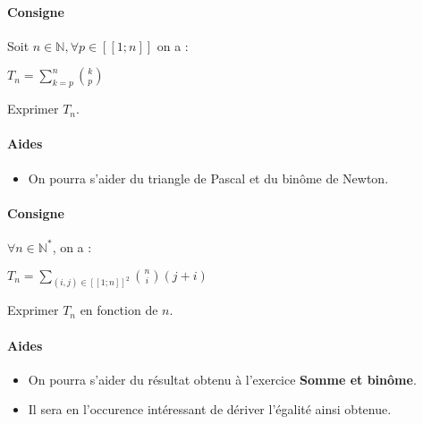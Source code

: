 \documentclass[a4paper]{report}
\begin{document}
				\begin{tcolorbox}[colback=white,colframe=black,title=Exercice - Somme et binôme]
				\paragraph{Consigne}
					Soit $n \in \mathbb{N}, \forall p \in [\![1;n]\!]$ on a :
					\begin{center}
						$T_n = \sum_{k=p}^{n} \binom{k}{p}$
					\end{center}
					Exprimer $T_n$.
					
				\tcblower					
					
				\paragraph{Aides}
					\begin{itemize}
						\item On pourra s'aider du triangle de Pascal et du binôme de Newton.
					\end{itemize}
				\end{tcolorbox}
				
				\begin{tcolorbox}[colback=white,colframe=black,title=Exercice - Somme\underline{s} et binôme]
				\paragraph{Consigne}
					$\forall n \in \mathbb{N^*}$, on a :
					\begin{center}
						$T_n = \sum_{(i,j) \in [\![1;n]\!]^2} \binom{n}{i} (j+i)$
					\end{center}
					Exprimer $T_n$ en fonction de $n$.
					
				\tcblower					
					
				\paragraph{Aides}
					\begin{itemize}
						\item On pourra s'aider du résultat obtenu à l'exercice \textbf{Somme et binôme}.
						\item Il sera en l'occurence intéressant de dériver l'égalité ainsi obtenue.
					\end{itemize}
				\end{tcolorbox}
			
\end{document}
